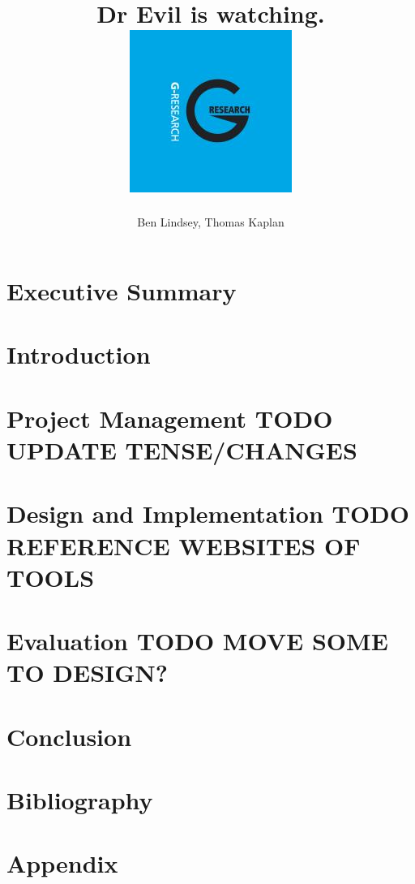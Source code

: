\documentclass[11pt]{report}
\title{	
  {\huge \project}\\
  {\large Dr Evil is watching.}\\[2em]
  {\includegraphics[scale=0.5]{G-Research.jpg}}
}
\author{Ben Lindsey, Thomas Kaplan}
\begin{document}
\maketitle

\chapter*{Executive Summary}


\tableofcontents

\chapter{Introduction}


\chapter{Project Management TODO UPDATE TENSE/CHANGES}


\chapter{Design and Implementation TODO REFERENCE WEBSITES OF TOOLS }


\chapter{Evaluation TODO MOVE SOME TO DESIGN?}


\chapter{Conclusion}


\chapter{Bibliography}
\printbibliography

\appendix
\chapter{Appendix}

\end{document}
